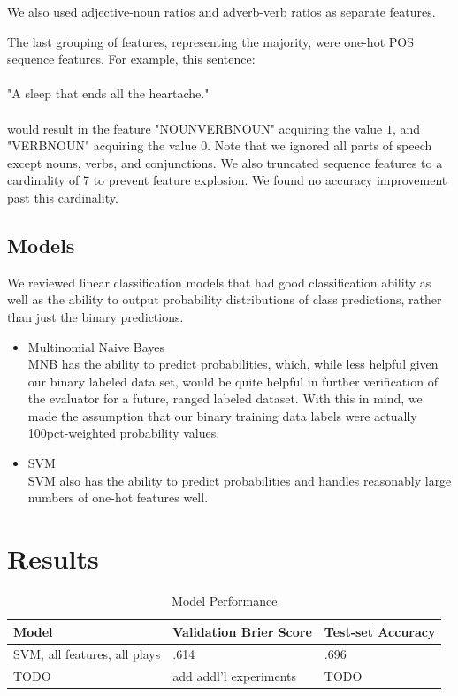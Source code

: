 \documentclass[letterpaper, 10 pt, conference]{ieeeconf}  %
\begin{document}
We also used adjective-noun ratios and adverb-verb ratios as separate features.

The last grouping of features, representing the majority, were one-hot POS sequence features. For example, this sentence: 
\\
\\
"A sleep that ends all the heartache."
\\
\\
would result in the feature "NOUN\textunderscore VERB\textunderscore NOUN" acquiring the value $1$, and "VERB\textunderscore NOUN" acquiring the value $0$. Note that we ignored all parts of speech except nouns, verbs, and conjunctions. We also truncated sequence features to a cardinality of 7 to prevent feature explosion. We found no accuracy improvement past this cardinality.


\subsection{Models}
We reviewed linear classification models that had good classification ability as well as the ability to output probability distributions of class predictions, rather than just the binary predictions.

    \begin{itemize}
      \item{Multinomial Naive Bayes} \\
      MNB has the ability to predict probabilities, which, while less helpful given our binary labeled data set, would be quite helpful in further verification of the evaluator for a future, ranged labeled dataset. With this in mind, we made the assumption that our binary training data labels were actually 100pct-weighted probability values. 
      \item{SVM}\\
      SVM also has the ability to predict probabilities and handles reasonably large numbers of one-hot features well.
    \end{itemize}
 

  \section{Results}
    \begin{table}[h]
      \caption{Model Performance}
      \label{table_example}
      \begin{center}
        \begin{tabular}{| p{2cm}  | p{2cm} | | p{2cm} }
        \hline
        Model & Validation Brier Score & Test-set Accuracy\\
        \hline
        SVM, all features, all plays & .614 & .696\\
        \hline
        TODO & add addl'l experiments & TODO \\
        \hline
        \end{tabular}
      \end{center}
    \end{table}
\end{document}
